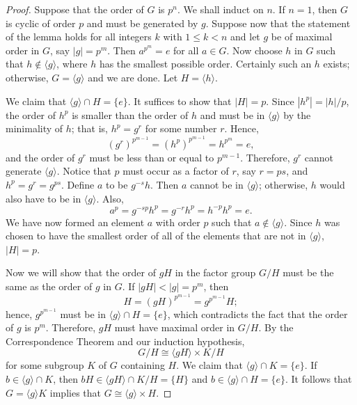  
\begin{proof}
Suppose that the order of $G$ is $p^n$.  We shall induct on $n$. If
$n= 1$, then $G$ is cyclic of order $p$ and must be generated by $g$.
Suppose now that the statement of the lemma holds for all integers $k$
with $1 \leq k < n$ and let $g$ be of maximal order in $G$, say
$|g| = p^{m}$.  Then $a^{p^m} = e$ for all $a \in G$. Now choose $h$
in $G$ such that $h \notin \langle g \rangle$, where $h$ has the
smallest possible order.  Certainly such an $h$ exists; otherwise, $G
= \langle g \rangle$ and we are done.  Let $H = \langle h \rangle$.
 
 
We claim that $\langle g \rangle \cap H = \{ e \}$. It suffices to
show that $|H|=p$.  Since $|h^p| = |h| / p$, the order of $h^p$ is
smaller than the order of $h$ and must be in $\langle g \rangle$ by
the minimality of $h$; that is, $h^p = g^r$ for some number $r$.
Hence, 
\[
(g^r)^{p^{m-1}} = (h^p)^{p^{m-1}} = h^{p^{m}} = e,
\]
and the order of $g^r$ must be less than or equal to $p^{m-1}$.
Therefore, $g^r$ cannot generate $\langle g \rangle$.  Notice that $p$
must occur as a factor of $r$, say $r = ps$, and $h^p = g^r = g^{ps}$.
Define $a$ to be $g^{-s}h$. Then $a$ cannot be in $\langle g \rangle$;
otherwise, $h$ would also have to be in $\langle g \rangle$. Also, 
\[
a^p = g^{-sp} h^p = g^{-r} h^p = h^{-p} h^p = e.
\]
We have now formed an element $a$ with order $p$ such that $a \notin
\langle g \rangle$. Since $h$ was chosen to have the smallest order of
all of the elements that are not in $\langle g \rangle$, $|H|  = p$.
 
 
Now we will show that the order of $gH$ in the factor group $G/H$ 
must be the same as the order of $g$ in $G$.  If $|gH| < |g| = 
p^m$, then
\[
H = (gH)^{p^{m-1}} =  g^{p^{m-1}} H;
\]
hence, $g^{p^{m-1}}$ must be in $\langle g \rangle \cap H = \{ e \}$,
which contradicts the fact that the order of $g$ is $p^m$.  Therefore,
$gH$ must have maximal order in $G/H$.  By the Correspondence Theorem
and our induction hypothesis,
\[
G/H \cong \langle gH \rangle \times K/H
\]
for some subgroup $K$ of $G$ containing $H$.  We
claim that $\langle g \rangle \cap K = \{ e \}$. If $b \in \langle g
\rangle \cap K$, then $bH \in \langle gH \rangle \cap K/H =  \{ H \}$ and
$b \in \langle g \rangle \cap H = \{ e \}$. It follows that $G =
\langle g \rangle K$ implies that $G \cong \langle g \rangle \times H$. 
\end{proof}
 
 
\vspace{2ex}
 

